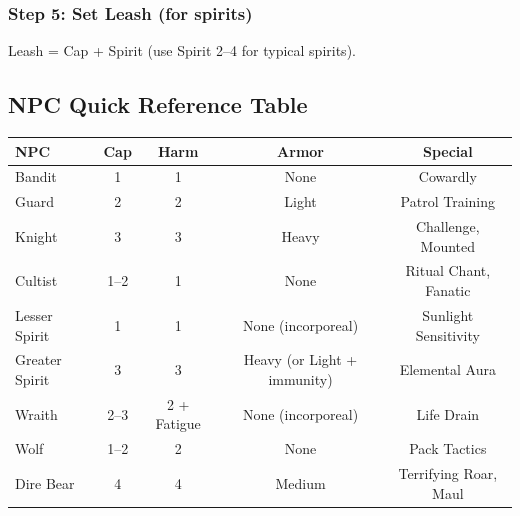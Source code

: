 \subsubsection{Step 5: Set Leash (for spirits)}
Leash = Cap + Spirit (use Spirit 2--4 for typical spirits).

\subsection{NPC Quick Reference Table}

\begin{tabular}{@{}lcccc@{}}
\toprule
\textbf{NPC} & \textbf{Cap} & \textbf{Harm} & \textbf{Armor} & \textbf{Special} \\
\midrule
Bandit & 1 & 1 & None & Cowardly \\
Guard & 2 & 2 & Light & Patrol Training \\
Knight & 3 & 3 & Heavy & Challenge, Mounted \\
Cultist & 1--2 & 1 & None & Ritual Chant, Fanatic \\
Lesser Spirit & 1 & 1 & None (incorporeal) & Sunlight Sensitivity \\
Greater Spirit & 3 & 3 & Heavy (or Light + immunity) & Elemental Aura \\
Wraith & 2--3 & 2 + Fatigue & None (incorporeal) & Life Drain \\
Wolf & 1--2 & 2 & None & Pack Tactics \\
Dire Bear & 4 & 4 & Medium & Terrifying Roar, Maul \\
\bottomrule
\end{tabular}


